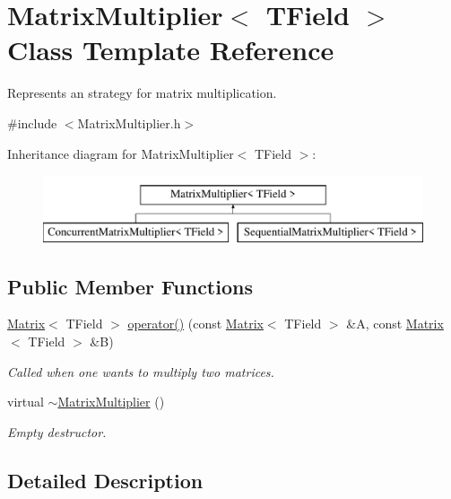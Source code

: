 \hypertarget{classMatrixMultiplier}{}\section{Matrix\+Multiplier$<$ T\+Field $>$ Class Template Reference}
\label{classMatrixMultiplier}


Represents an strategy for matrix multiplication.  




{\ttfamily \#include $<$Matrix\+Multiplier.\+h$>$}

Inheritance diagram for Matrix\+Multiplier$<$ T\+Field $>$\+:\begin{figure}[H]
\begin{center}
\leavevmode
\includegraphics[height=2.000000cm]{classMatrixMultiplier}
\end{center}
\end{figure}
\subsection*{Public Member Functions}
\begin{DoxyCompactItemize}
\item 
\mbox{\hyperlink{classMatrix}{Matrix}}$<$ T\+Field $>$ \mbox{\hyperlink{classMatrixMultiplier_ae3ad21bb6cbe616e4890b20b8d98f4f6}{operator()}} (const \mbox{\hyperlink{classMatrix}{Matrix}}$<$ T\+Field $>$ \&A, const \mbox{\hyperlink{classMatrix}{Matrix}}$<$ T\+Field $>$ \&B)
\begin{DoxyCompactList}\small\item\em Called when one wants to multiply two matrices. \end{DoxyCompactList}\item 
virtual \mbox{\hyperlink{classMatrixMultiplier_a2c2ef9361dfb7fed622abbb282ba2269}{$\sim$\+Matrix\+Multiplier}} ()
\begin{DoxyCompactList}\small\item\em Empty destructor. \end{DoxyCompactList}\end{DoxyCompactItemize}


\subsection{Detailed Description}
